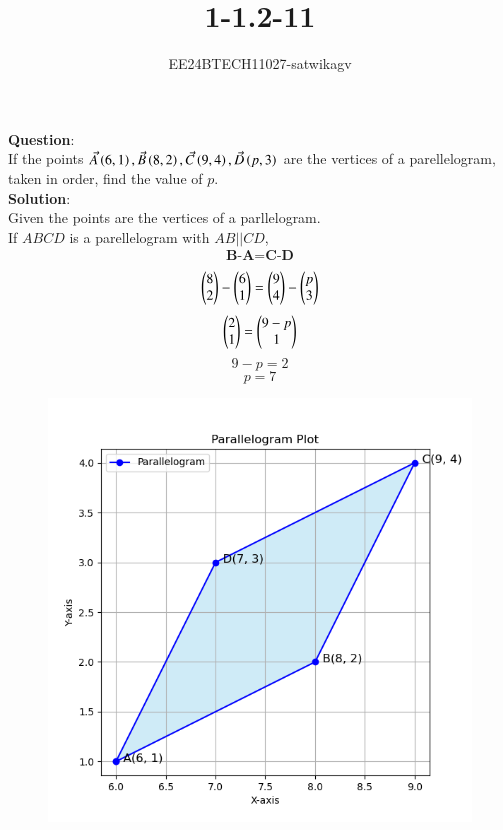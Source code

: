 \documentclass[journal]{IEEEtran}
\begin{document}

\vspace{3cm}

\title{1-1.2-11}
\author{EE24BTECH11027-satwikagv}
{\let\newpage\relax\maketitle}

\renewcommand{\thefigure}{\theenumi}
\renewcommand{\thetable}{\theenumi}
\setlength{\intextsep}{10pt} %


\renewcommand{\thetable}{\theenumi}
\textbf{Question}:\\
If the points $\Vec{A}\left(6,1\right),\Vec{B}\left(8,2\right),\Vec{C}\left(9,4\right),\Vec{D}\left(p,3\right)$ are the vertices of a parellelogram, taken in order, find the value of $p$.\\
\textbf{Solution}:\\Given the points are the vertices of a parllelogram. \\If $ABCD$ is a parellelogram with $AB||CD$,\\
\begin{align}{\textbf{B-A=C-D}} 
\end{align}
$$\begin{pmatrix}8\\2\end{pmatrix}-\begin{pmatrix}6\\1\end{pmatrix}=\begin{pmatrix}9\\4\end{pmatrix}-\begin{pmatrix}p\\3\end{pmatrix}$$
$$\begin{pmatrix}2\\1\end{pmatrix}=\begin{pmatrix}9-p\\1\end{pmatrix}$$
$$9-p=2$$
$$p=7$$
\begin{figure}[h!]
   \centering
   \includegraphics[width=0.7\linewidth]{figs/parallelogram_plot.png}
   
   
\end{figure}
\end{document}
